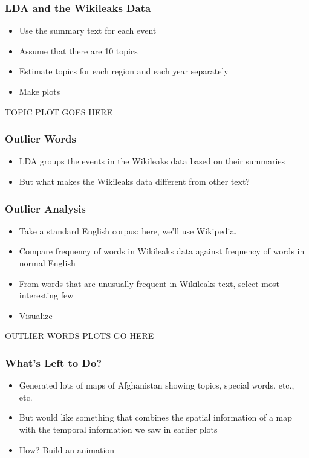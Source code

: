\documentclass[xcolor=dvipsnames, 9pt]{beamer}
\begin{document}
\begin{frame}[fragile]
  \frametitle{LDA and the Wikileaks Data}
  
  \begin{itemize}
    \item{Use the summary text for each event}
    \item{Assume that there are 10 topics}
    \item{Estimate topics for each region and each year separately}
    \item{Make plots}
  \end{itemize}
\end{frame}

\begin{frame}[fragile]
  TOPIC PLOT GOES HERE
\end{frame}

\begin{frame}
  \frametitle{Outlier Words}
  
  \begin{itemize}
    \item{LDA groups the events in the Wikileaks data based on their summaries}
    \item{But what makes the Wikileaks data different from other text?}
  \end{itemize}
\end{frame}

\begin{frame}[fragile]
  \frametitle{Outlier Analysis}
  
  \begin{itemize}
    \item{Take a standard English corpus: here, we'll use Wikipedia.}
    \item{Compare frequency of words in Wikileaks data against frequency of words in normal English}
    \item{From words that are unusually frequent in Wikileaks text, select most interesting few}
    \item{Visualize}
  \end{itemize}
\end{frame}

\begin{frame}
  OUTLIER WORDS PLOTS GO HERE
\end{frame}

\begin{frame}[fragile]
  \frametitle{What's Left to Do?}
  
  \begin{itemize}
    \item{Generated lots of maps of Afghanistan showing topics, special words, etc., etc.}
    \item{But would like something that combines the spatial information of a map with the temporal information we saw in earlier plots}
    \item{How? Build an animation}
  \end{itemize}
\end{frame}
\end{document}
